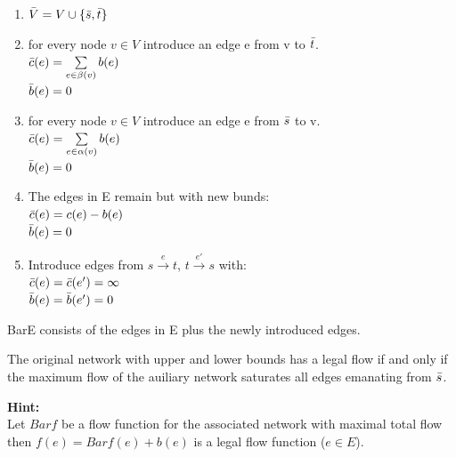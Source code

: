\begin{enumerate}
  \item $\Bar{V} = V \cup \{\Bar{s}, \Bar{t}\}$
  \item for every node $v \in V$ introduce an edge e from v to $\Bar{t}$.\\
  $\Bar{c}(e) = \sum\limits_{e \in \beta (v)} b(e)$\\
  $\Bar{b}(e) = 0$
  \item for every node $v \in V$ introduce an edge e from $\Bar{s}$ to v.\\
  $\Bar{c}(e) = \sum\limits_{e \in \alpha (v)} b(e)$\\
  $\Bar{b}(e) = 0$
  \item The edges in E remain but with new bunds:\\
  $\Bar{c}(e) = c(e) - b(e)$\\
  $\Bar{b}(e) = 0$
  \item Introduce edges from $s \overset{e}\rightarrow t$, $t \overset{e'}\rightarrow s$ with:\\
  $\Bar{c}(e) = \Bar{c}(e') = \infty$\\
  $\Bar{b}(e) = \Bar{b}(e') = 0$
\end{enumerate}

Bar{E} consists of the edges in E plus the newly introduced edges.


\begin{lemma}
The original network with upper and lower bounds has a legal flow if and only if the maximum flow of the auiliary network saturates all edges emanating from $\Bar{s}$.
\end{lemma}


\textbf{Hint:}\\
Let $Bar{f}$ be a flow function for the associated network with maximal total flow then $f(e) = Bar{f}(e) + b(e)$ is a legal flow function ($e \in E$).

